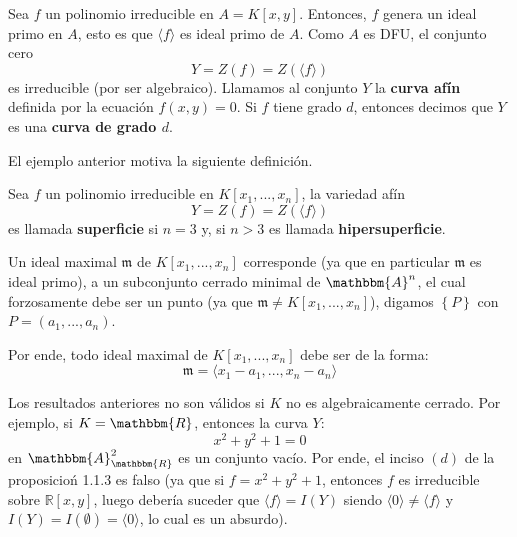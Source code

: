 \documentclass[12pt]{report}
\theoremstyle{largebreak}
\newcommand{\bbm}[1]{\ensuremath{\mathbbm{#1}}}
\newcommand{\fk}[1]{\ensuremath{\mathfrak{#1}}}
\newcommand{\gen}[1]{\ensuremath{\langle#1\rangle}}
\begin{document}
    \begin{exa}
        Sea $f$ un polinomio irreducible en $A=K[x,y]$. Entonces, $f$ genera un ideal primo en $A$, esto es que $\gen{f}$ es ideal primo de $A$. Como $A$ es DFU, el conjunto cero
        \begin{equation*}
            Y=Z(f)=Z(\gen{f})
        \end{equation*}
        es irreducible (por ser algebraico). Llamamos al conjunto $Y$ la \textbf{curva afín} definida por la ecuación $f(x,y)=0$. Si $f$ tiene grado $d$, entonces decimos que $Y$ es una \textbf{curva de grado $d$}.
    \end{exa}

    El ejemplo anterior motiva la siguiente definición.

    \begin{mydef}
        Sea $f$ un polinomio irreducible en $K[x_1,...,x_n]$, la variedad afín
        \begin{equation*}
            Y=Z(f)=Z(\gen{f})
        \end{equation*}
        es llamada \textbf{superficie} si $n=3$ y, si $n>3$ es llamada \textbf{hipersuperficie}.
    \end{mydef}

    \begin{exa}
        Un ideal maximal $\fk{m}$ de $K[x_1,...,x_n]$ corresponde (ya que en particular $\fk{m}$ es ideal primo), a un subconjunto cerrado minimal de $\bbm{A}^n$, el cual forzosamente debe ser un punto (ya que $\fk{m}\neq K[x_1,...,x_n]$), digamos $\left\{P \right\}$ con $P=(a_1,...,a_n)$.

        Por ende, todo ideal maximal de $K[x_1,...,x_n]$ debe ser de la forma:
        \begin{equation*}
            \fk{m}=\gen{x_1-a_1,...,x_n-a_n}
        \end{equation*}
    \end{exa}

    \begin{exa}
        Los resultados anteriores no son válidos si $K$ no es algebraicamente cerrado. Por ejemplo, si $K=\bbm{R}$, entonces la curva $Y$:
        \begin{equation*}
            x^2+y^2+1=0
        \end{equation*}
        en $\bbm{A}^2_{\bbm{R}}$ es un conjunto vacío. Por ende, el inciso $(d)$ de la proposicioń 1.1.3 es falso (ya que si $f=x^2+y^2+1$, entonces $f$ es irreducible sobre $\mathbb{R}[x,y]$, luego debería suceder que $\gen{f}=I(Y)$ siendo $\gen{0}\neq\gen{f}$ y $I(Y)=I(\emptyset)=\gen{0}$, lo cual es un absurdo).
    \end{exa}
\end{document}
